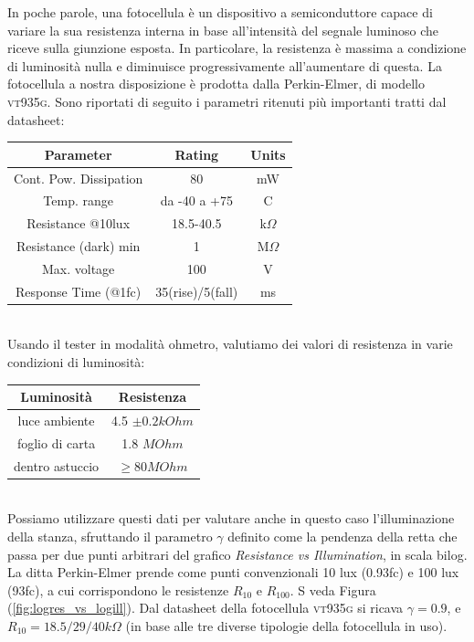 \documentclass[journal, a4paper]{IEEEtran}
\begin{document}
In poche parole, una fotocellula è un dispositivo a semiconduttore capace di variare la sua resistenza interna in base all'intensità del segnale luminoso che riceve sulla giunzione esposta. In particolare, la resistenza è massima a condizione di luminosità nulla e diminuisce progressivamente all'aumentare di questa. La fotocellula a nostra disposizione è prodotta dalla Perkin-Elmer, di modello \textsc{vt935g}. Sono riportati di seguito i parametri ritenuti più importanti tratti dal datasheet:\\

\begin{tabular}{|c|c|c|}
\hline \textbf{Parameter} & \textbf{Rating} & \textbf{Units} \\ 
\hline Cont. Pow. Dissipation & 80 & mW \\ 
\hline Temp. range & da -40 a +75 & C \\ 
\hline Resistance @10lux & 18.5-40.5 & k$\Omega$ \\ 
\hline Resistance (dark) min & 1 & M$\Omega$ \\ 
\hline Max. voltage & 100 & V \\ 
\hline Response Time (@1fc) & 35(rise)/5(fall) & ms \\ 
\hline 
\end{tabular} 

~\\
Usando il tester in modalità ohmetro, valutiamo dei valori di resistenza in varie condizioni di luminosità:\\

\begin{tabular}{|c|c|}
\hline \textbf{Luminosità} & \textbf{Resistenza} \\ 
\hline luce ambiente  & 4.5 $\pm 0.2 \si{kOhm}$ \\ 
\hline foglio di carta & 1.8 $\si{MOhm}$ \\ 
\hline dentro astuccio & $ \geq 80 \si{MOhm}$ \\ 
\hline 
\end{tabular} 

~\\

Possiamo utilizzare questi dati per valutare anche in questo caso l'illuminazione della stanza, sfruttando il parametro $\gamma$ definito come la pendenza della retta che passa per due punti arbitrari del grafico \textit{Resistance vs Illumination}, in scala bilog. La ditta Perkin-Elmer prende come punti convenzionali 10 lux (0.93fc) e 100 lux (93fc), a cui corrispondono le resistenze $R_{10}$ e $R_{100}$. S veda Figura (\ref{fig:logres_vs_logill}). Dal datasheet della fotocellula \textsc{vt935g} si ricava $\gamma = 0.9$, e $R_{10} = 18.5/29/40 k\Omega$ (in base alle tre diverse tipologie della fotocellula in uso).\\
\end{document}
